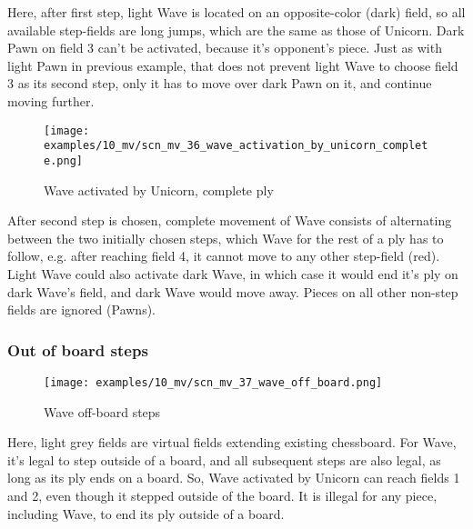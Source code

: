Here, after first step, light Wave is located on an opposite-color (dark) field, so all available
step-fields are long jumps, which are the same as those of Unicorn. Dark Pawn on field 3 can't be
activated, because it's opponent's piece. Just as with light Pawn in previous example, that does
not prevent light Wave to choose field 3 as its second step, only it has to move over dark Pawn
on it, and continue moving further.

\clearpage %

\vspace*{-2.1\baselineskip}
\noindent
\begin{figure}[!h]
\texttt{[image: examples/10\_mv/scn\_mv\_36\_wave\_activation\_by\_unicorn\_complete.png]}
\caption{Wave activated by Unicorn, complete ply}
\label{fig:scn_mv_36_wave_activation_by_unicorn_complete}
\end{figure}

After second step is chosen, complete movement of Wave consists of alternating between the two initially
chosen steps, which Wave for the rest of a ply has to follow, e.g. after reaching field 4, it cannot move
to any other step-field (red). Light Wave could also activate dark Wave, in which case it would end it's
ply on dark Wave's field, and dark Wave would move away. Pieces on all other non-step fields are ignored
(Pawns).

\clearpage %

\subsubsection*{Out of board steps}

\vspace*{-1.4\baselineskip}
\noindent
\begin{figure}[!h]
\texttt{[image: examples/10\_mv/scn\_mv\_37\_wave\_off\_board.png]}
\caption{Wave off-board steps}
\label{fig:scn_mv_37_wave_off_board}
\end{figure}

Here, light grey fields are virtual fields extending existing chessboard.
For Wave, it's legal to step outside of a board, and all subsequent steps
are also legal, as long as its ply ends on a board. So, Wave activated by
Unicorn can reach fields 1 and 2, even though it stepped outside of the
board. It is illegal for any piece, including Wave, to end its ply outside
of a board.

